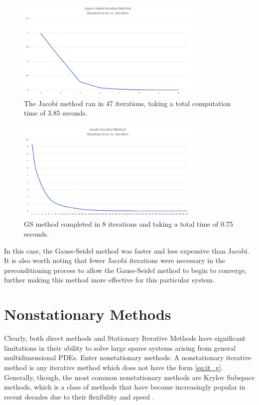 \documentclass[10pt]{article}
\begin{document}
\begin{multicols}{2}
\begin{figure}[H]
	\centering
	\includegraphics[width=3.5in]{../img/fred_stat_it/img1.png}
	\caption{The Jacobi method ran in 47 iterations, taking a total computation time of 3.85 seconds.}
\end{figure}

\begin{figure}[H]
	\centering
	\includegraphics[width=3.5in]{../img/fred_stat_it/img2.png}
	\caption{GS method completed in 8 iterations and taking a total time of 0.75 seconds.}
\end{figure}

In this case, the Gauss-Seidel method was faster and less expensive than Jacobi.
It is also worth noting that fewer Jacobi iterations were necessary in the preconditioning process to allow the Gauss-Seidel method to begin to converge, further making this method more effective for this particular system.

\section{Nonstationary Methods}
Clearly, both direct methods and Stationary Iterative Methods have significant limitations in their ability to solve large sparse systems arising from general multidimensional PDEs.
Enter nonstationary methods.
A nonstationary iterative method is any iterative method which does not have the form \eqref{eq:it_g}.
Generally, though, the most common nonstationary methods are Krylov Subspace methods, which is a class of methods that have become increasingly popular in recent decades due to their flexibility and speed \citep{gutknecht_brief_2007}.


\end{multicols}
\end{document}
